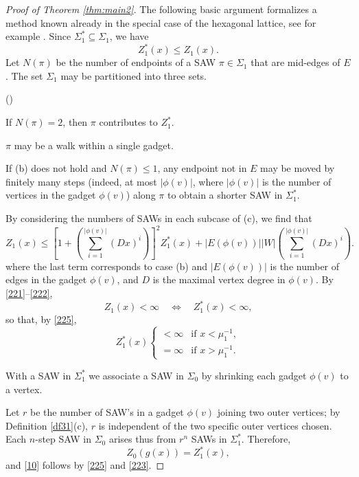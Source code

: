 \documentclass[12pt]{amsart}
\theoremstyle{plain}
\numberwithin{equation}{section}
\numberwithin{theorem}{section}
\numberwithin{figure}{section}
\newcounter{mycount}
\newenvironment{letlist}{\begin{list}{\rm(\alph{mycount})}%
   {\usecounter{mycount}\labelwidth=1cm\itemsep 0pt}}{\end{list}}
\newcommand\oo{\infty}
\begin{document}
\begin{proof}[Proof of Theorem \ref{thm:main2}]
The following basic argument
formalizes a method known already in the special case of the 
hexagonal lattice, see for example \cite{g,jg}.
Since $\Sigma_1^* \subseteq \Sigma_1$, we have 
\begin{equation}\label{221}
Z_1^*(x) \le Z_1(x).
\end{equation}
Let  $N(\pi)$ be the number of endpoints of a SAW 
$\pi\in \Sigma_1$ 
that are mid-edges of $E$. 
The set $\Sigma_1$ may be partitioned into three sets.
\begin{letlist}
\item If $N(\pi)=2$, then $\pi$ contributes
to $Z_1^*$.
\item $\pi$ may be a  walk within a single gadget.
\item If (b) does not hold and $N(\pi)\le 1$, any endpoint not in $E$ may
be moved by finitely many steps (indeed, at most $|\phi(v)|$, where $|\phi(v)|$ is the number of vertices in the gadget $\phi(v)$) along $\pi$ to obtain a shorter SAW in $\Sigma_1^*$.
\end{letlist}
By considering the numbers of SAWs in each subcase of (c), we find that
\begin{equation}\label{222}
Z_1(x) \leq  
\left[1+\left(\sum_{i=1}^{|\phi(v)|}(Dx)^i\right)\right]^2 Z_1^*(x) +|E(\phi(v))||W|\left(\sum_{i=1}^{|\phi(v)|}(Dx)^i
\right).
\end{equation}
where the last term corresponds to case (b) and $|E(\phi(v))|$ is the number of edges in the gadget $\phi(v)$, and $D$ is the maximal vertex degree in $\phi(v)$.
By \eqref{221}--\eqref{222}, 
$$
Z_1(x)<\oo \quad\Leftrightarrow\quad Z_1^*(x)<\oo,
$$
so that, by \eqref{225}, 
\begin{equation}\label{223}
Z_1^*(x) \begin{cases} <\oo &\text{if } x < \mu_1^{-1},\\
=\oo &\text{if } x > \mu_1^{-1}.
\end{cases}
\end{equation}

With a SAW in $\Sigma_1^*$ we associate a SAW in $\Sigma_0$ 
by shrinking each gadget $\phi(v)$ to a vertex. 

Let $r$ be the number of SAW's in a gadget $\phi(v)$ joining two outer vertices; by Definition \ref{df31}(c), $r$ is independent of the two specific outer vertices chosen.
Each $n$-step SAW  
in $\Sigma_0$ arises thus from $r^n$ SAWs in $\Sigma_1^*$. 
Therefore,
\begin{equation}\label{r2}
Z_0(g(x))=Z_{1}^*(x),
\end{equation}
and \eqref{10} follows by \eqref{225} and \eqref{223}.
\end{proof}
\end{document}
